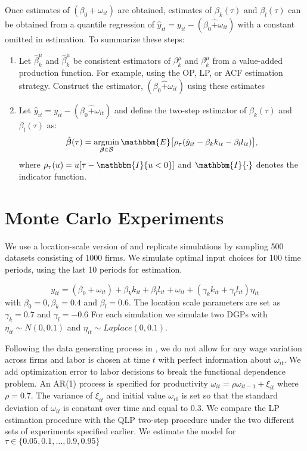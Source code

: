 \documentclass[11pt]{article}
\begin{document}
Once estimates of $(\beta_{0}+\omega_{it})$ are obtained, estimates of $\beta_{k}(\tau)$ and $\beta_{l}(\tau)$
can be obtained from a quantile regression of $\hat{y}_{it}=y_{it}-(\beta_{0}\hat{+}\omega_{it})$ with a constant omitted in estimation. To summarize these steps:
\begin{enumerate}
	\item Let $\hat{\beta}_{k}^{\mu}$ and $\hat{\beta}_{k}^{\mu}$ be consistent estimators of $\beta_{k}^{\mu}$ and $\beta_{k}^{\mu}$ from a value-added production function. For example, using the OP, LP, or ACF estimation strategy. Construct the estimator, $(\beta_{0}\hat{+}\omega_{it})$ using these estimates
	\item Let $\hat{y}_{it}=y_{it}-(\beta_{0}\hat{+}\omega_{it})$ and define the two-step estimator of $\beta_{k}(\tau)$ and $\beta_{l}(\tau)$ as:
	\begin{equation*}
	\hat{\boldsymbol{\beta}}(\tau)=\underset{\boldsymbol{\beta}\in\mathcal{B}}{\operatorname{argmin}}\, \mathbbm{E}\big[\rho_{\tau}(\hat{y}_{it}-\beta_{k}k_{it}-\beta_{l}l_{it})\big],
	\end{equation*}
	where $\rho_{\tau}(u)=u[\tau-\mathbbm{I}\{u<0\}]$ and $\mathbbm{I}\{\cdot\}$ denotes the indicator function.
\end{enumerate}

\section{Monte Carlo Experiments} \label{montecarlo}
We use a location-scale version of \cite{Levinsohn2003} and replicate \cite{Ackerberg2015} simulations by sampling 500 datasets consisting of 1000 firms. We simulate optimal input choices for 100 time periods, using the last 10 periods for estimation. 

\begin{equation}
y_{it}=(\beta_{0}+\omega_{it})+\beta_{k}k_{it}+\beta_{l}l_{it}+\omega_{it}+(\gamma_{k}k_{it}+\gamma_{l}l_{it})\eta_{it}
\end{equation}
with $\beta_{0}=0, \beta_{k}=0.4$ and $\beta_{l}=0.6$. The location scale parameters are set as $\gamma_{k}=0.7$ and $\gamma_{l}=-0.6$ For each simulation we simulate two DGPs with $\eta_{it}\sim N(0,0.1)$ and $\eta_{it}\sim Laplace(0,0.1)$.

Following the data generating process in \cite{Ackerberg2015}, we do not allow for any wage variation across firms and labor is chosen at time $t$ with perfect information about $\omega_{it}$. We add optimization error to labor decisions to break the functional dependence problem. An AR(1) process is specified for productivity $\omega_{it}=\rho\omega_{it-1}+\xi_{it}$ where $\rho=0.7$. The variance of $\xi_{it}$ and initial value $\omega_{i0}$ is set so that the standard deviation of $\omega_{it}$ is constant over time and equal to $0.3$. We compare the LP estimation procedure with the QLP two-step procedure under the two different sets of experiments specified earlier. We estimate the model for $\tau\in\{0.05, 0.1, \dots, 0.9, 0.95\}$ 
\end{document}
